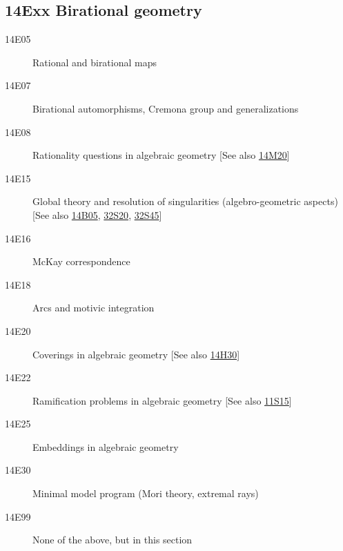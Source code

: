 \subsection*{14Exx Birational geometry }\label{14Exx}
\begin{description}               
\item [14E05]\label{14E05} Rational and birational maps
\item [14E07]\label{14E07} Birational automorphisms, Cremona group and generalizations
\item [14E08]\label{14E08} Rationality questions in algebraic geometry [See also \hyperref[14M20]{14M20}]
\item [14E15]\label{14E15} Global theory and resolution of singularities (algebro-geometric aspects) [See also \hyperref[14B05]{14B05}, \hyperref[32S20]{32S20}, \hyperref[32S45]{32S45}]
\item [14E16]\label{14E16} McKay correspondence
\item [14E18]\label{14E18} Arcs and motivic integration
\item [14E20]\label{14E20} Coverings in algebraic geometry [See also \hyperref[14H30]{14H30}]
\item [14E22]\label{14E22} Ramification problems in algebraic geometry [See also \hyperref[11S15]{11S15}]
\item [14E25]\label{14E25} Embeddings in algebraic geometry
\item [14E30]\label{14E30} Minimal model program (Mori theory, extremal rays)
\item [14E99]\label{14E99} None of the above, but in this section
\end{description}
